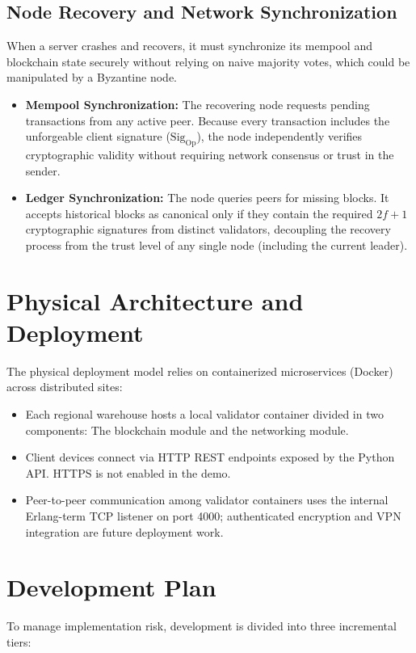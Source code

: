 \documentclass[11pt, a4paper, oneside]{memoir}
\begin{document}
\subsection{Node Recovery and Network Synchronization}
When a server crashes and recovers, it must synchronize its mempool and blockchain state securely without relying on naive majority votes, which could be manipulated by a Byzantine node.
\begin{itemize}
    \item \textbf{Mempool Synchronization:} The recovering node requests pending transactions from any active peer. Because every transaction includes the unforgeable client signature ($\text{Sig}_{\text{Op}}$), the node independently verifies cryptographic validity without requiring network consensus or trust in the sender.
    \item \textbf{Ledger Synchronization:} The node queries peers for missing blocks. It accepts historical blocks as canonical only if they contain the required $2f+1$ cryptographic signatures from distinct validators, decoupling the recovery process from the trust level of any single node (including the current leader).
\end{itemize}


\section{Physical Architecture and Deployment}
The physical deployment model relies on containerized microservices (Docker) across distributed sites:
\begin{itemize}
    \item Each regional warehouse hosts a local validator container divided in two components: The blockchain module and the networking module. 
    \item Client devices connect via HTTP REST endpoints exposed by the Python
    API. HTTPS is not enabled in the demo.
    \item Peer-to-peer communication among validator containers uses the
    internal Erlang-term TCP listener on port 4000; authenticated encryption
    and VPN integration are future deployment work.
\end{itemize}

\section{Development Plan}
To manage implementation risk, development is divided into three incremental tiers:
\end{document}

